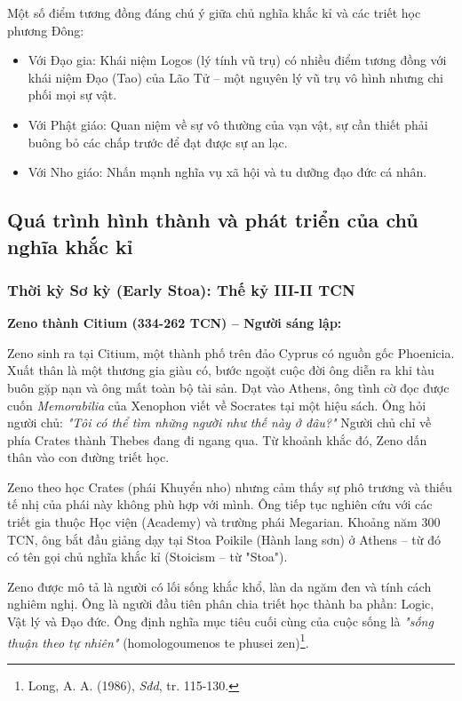 Một số điểm tương đồng đáng chú ý giữa chủ nghĩa khắc kỉ và các triết học phương Đông:
\begin{itemize}[leftmargin=1.5cm]
    \item Với Đạo gia: Khái niệm Logos (lý tính vũ trụ) có nhiều điểm tương đồng với khái niệm Đạo (Tao) của Lão Tử – một nguyên lý vũ trụ vô hình nhưng chi phối mọi sự vật.
    \item Với Phật giáo: Quan niệm về sự vô thường của vạn vật, sự cần thiết phải buông bỏ các chấp trước để đạt được sự an lạc.
    \item Với Nho giáo: Nhấn mạnh nghĩa vụ xã hội và tu dưỡng đạo đức cá nhân.
\end{itemize}

\subsection{Quá trình hình thành và phát triển của chủ nghĩa khắc kỉ}

\subsubsection{Thời kỳ Sơ kỳ (Early Stoa): Thế kỷ III-II TCN}

\textbf{Zeno thành Citium (334-262 TCN) – Người sáng lập:}

Zeno sinh ra tại Citium, một thành phố trên đảo Cyprus có nguồn gốc Phoenicia. Xuất thân là một thương gia giàu có, bước ngoặt cuộc đời ông diễn ra khi tàu buôn gặp nạn và ông mất toàn bộ tài sản. Dạt vào Athens, ông tình cờ đọc được cuốn \textit{Memorabilia} của Xenophon viết về Socrates tại một hiệu sách. Ông hỏi người chủ: \textit{"Tôi có thể tìm những người như thế này ở đâu?"} Người chủ chỉ về phía Crates thành Thebes đang đi ngang qua. Từ khoảnh khắc đó, Zeno dấn thân vào con đường triết học.

Zeno theo học Crates (phái Khuyển nho) nhưng cảm thấy sự phô trương và thiếu tế nhị của phái này không phù hợp với mình. Ông tiếp tục nghiên cứu với các triết gia thuộc Học viện (Academy) và trường phái Megarian. Khoảng năm 300 TCN, ông bắt đầu giảng dạy tại Stoa Poikile (Hành lang sơn) ở Athens – từ đó có tên gọi chủ nghĩa khắc kỉ (Stoicism – từ "Stoa").

Zeno được mô tả là người có lối sống khắc khổ, làn da ngăm đen và tính cách nghiêm nghị. Ông là người đầu tiên phân chia triết học thành ba phần: Logic, Vật lý và Đạo đức. Ông định nghĩa mục tiêu cuối cùng của cuộc sống là \textit{"sống thuận theo tự nhiên"} (homologoumenos te phusei zen)\footnote{Long, A. A. (1986), \textit{Sđd}, tr. 115-130.}.

